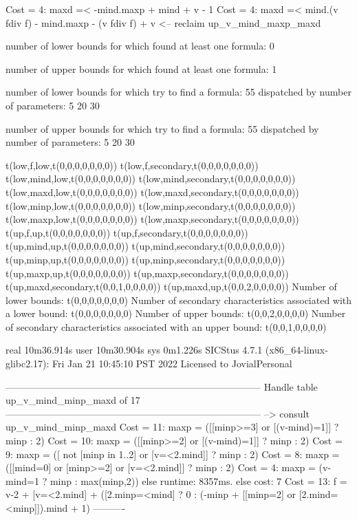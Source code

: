 Cost =  4:  maxd =< -mind.maxp + mind + v - 1
Cost =  4:  maxd =< mind.(v fdiv f) - mind.maxp - (v fdiv f) + v
<-- reclaim up_v_mind_maxp_maxd

number of lower bounds for which found at least one formula: 0

number of upper bounds for which found at least one formula: 1

number of lower bounds for which try to find a formula: 55
dispatched by number of parameters: 5  20  30

number of upper bounds for which try to find a formula: 55
dispatched by number of parameters: 5  20  30

t(low,f,low,t(0,0,0,0,0,0,0))
t(low,f,secondary,t(0,0,0,0,0,0,0))
t(low,mind,low,t(0,0,0,0,0,0,0))
t(low,mind,secondary,t(0,0,0,0,0,0,0))
t(low,maxd,low,t(0,0,0,0,0,0,0))
t(low,maxd,secondary,t(0,0,0,0,0,0,0))
t(low,minp,low,t(0,0,0,0,0,0,0))
t(low,minp,secondary,t(0,0,0,0,0,0,0))
t(low,maxp,low,t(0,0,0,0,0,0,0))
t(low,maxp,secondary,t(0,0,0,0,0,0,0))
t(up,f,up,t(0,0,0,0,0,0,0))
t(up,f,secondary,t(0,0,0,0,0,0,0))
t(up,mind,up,t(0,0,0,0,0,0,0))
t(up,mind,secondary,t(0,0,0,0,0,0,0))
t(up,minp,up,t(0,0,0,0,0,0,0))
t(up,minp,secondary,t(0,0,0,0,0,0,0))
t(up,maxp,up,t(0,0,0,0,0,0,0))
t(up,maxp,secondary,t(0,0,0,0,0,0,0))
t(up,maxd,secondary,t(0,0,1,0,0,0,0))
t(up,maxd,up,t(0,0,2,0,0,0,0))
Number of lower bounds:                                             t(0,0,0,0,0,0,0)
Number of secondary characteristics associated with a lower bound:  t(0,0,0,0,0,0,0)
Number of upper bounds:                                             t(0,0,2,0,0,0,0)
Number of secondary characteristics associated with an upper bound: t(0,0,1,0,0,0,0)

real	10m36.914s
user	10m30.904s
sys	0m1.226s
SICStus 4.7.1 (x86_64-linux-glibc2.17): Fri Jan 21 10:45:10 PST 2022
Licensed to JovialPersonal


--------------------------------------------------------------------------------
Handle table up_v_mind_minp_maxd of 17
--------------------------------------------------------------------------------
--> consult up_v_mind_minp_maxd
Cost = 11:  maxp = ([[minp>=3] or [(v-mind)=1]] ? minp : 2)
Cost = 10:  maxp = ([[minp>=2] or [(v-mind)=1]] ? minp : 2)
Cost =  9:  maxp = ([ not [minp in 1..2] or [v=<2.mind]] ? minp : 2)
Cost =  8:  maxp = ([[mind=0] or [minp>=2] or [v=<2.mind]] ? minp : 2)
Cost =  4:  maxp = (v-mind=1 ? minp : max(minp,2))
else runtime: 8357ms. else cost: 7
Cost = 13:  f    = v-2 + [v=<2.mind] + ([2.minp=<mind] ? 0 : (-minp + [[minp=2] or [2.mind=<minp]]).mind + 1) %
----------

